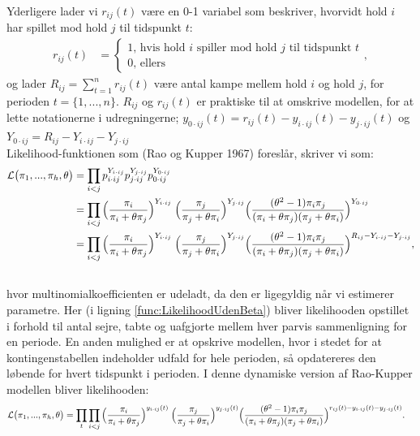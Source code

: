 \documentclass[11pt,a4paper]{article}
\begin{document}
Yderligere lader vi $r_{ij}(t)$ være en 0-1 variabel som beskriver, hvorvidt hold $i$ har spillet mod hold $j$ til tidspunkt $t$:
\begin{align*}
r_{ij}(t)&=\begin{cases}
1\text{, hvis hold $i$ spiller mod hold $j$ til tidspunkt $t$}\\
0\text{, ellers}
\end{cases},
\end{align*}
og lader $R_{ij}=\sum_{t=1}^nr_{ij}(t)$ være antal kampe mellem hold $i$ og hold $j$, for perioden $t=\{1,...,n\}$. $R_{ij}$ og $r_{ij}(t)$ er praktiske til at omskrive modellen, for at lette notationerne i udregningerne; $y_{0\cdot ij}(t)=r_{ij}(t)-y_{i\cdot ij}(t)-y_{j\cdot ij}(t)$ og $Y_{0\cdot ij}=R_{ij}-Y_{i\cdot ij}-Y_{j\cdot ij}$\\
Likelihood-funktionen som (Rao og Kupper 1967) \cite{RaoKupper} foreslår, skriver vi som:
\begin{align}
\mathcal{L}\big{(}\pi_1,...,\pi_h,\theta\big{)} &= \prod_{i<j}p_{i\cdot ij}^{Y_{i\cdot ij}}p_{j\cdot ij}^{Y_{j\cdot ij}}p_{0\cdot ij}^{Y_{0\cdot ij}}  \nonumber\\
&= \prod_{i<j}\Big{(}\frac{\pi_i}{\pi_i+\theta\pi_j}\Big{)}^{Y_{i\cdot ij}} \label{func:LikelihoodUdenBeta}
\;\Big{(}\frac{\pi_j}{\pi_j+\theta\pi_i}\Big{)}^{Y_{j\cdot ij}}
\Big{(}\frac{(\theta^2-1)\pi_i \pi_j}{(\pi_i+\theta\pi_j)(\pi_j+\theta\pi_i)}\Big{)}^{Y_{0\cdot ij}}\\
&=\prod_{i<j}\Big{(}\frac{\pi_i}{\pi_i+\theta\pi_j}\Big{)}^{Y_{i\cdot ij}}
\;\Big{(}\frac{\pi_j}{\pi_j+\theta\pi_i}\Big{)}^{Y_{j\cdot ij}}
\Big{(}\frac{(\theta^2-1)\pi_i  \pi_j}{(\pi_i+\theta\pi_j)(\pi_j+\theta\pi_i)}\Big{)}^{R_{ij}-{Y_{i\cdot ij}}-{Y_{j\cdot ij}}},\nonumber\\ \nonumber
\end{align}
hvor multinomialkoefficienten er udeladt, da den er ligegyldig når vi estimerer parametre. Her (i ligning \ref{func:LikelihoodUdenBeta}) bliver likelihooden opstillet i forhold til antal sejre, tabte og uafgjorte mellem hver parvis sammenligning for en periode. En anden mulighed er at opskrive modellen, hvor i stedet for at kontingenstabellen indeholder udfald for hele perioden, så opdatereres den løbende for hvert tidspunkt i perioden. I denne dynamiske version af Rao-Kupper modellen bliver likelihooden:
\begin{align*}
\mathcal{L}\big{(}\pi_1,...,\pi_h,\theta\big{)}
&=\prod_t\prod_{i<j}\Big{(}\frac{\pi_i}{\pi_i+\theta\pi_j}\Big{)}^{y_{i\cdot ij}(t)}
\;\Big{(}\frac{\pi_j}{\pi_j+\theta\pi_i}\Big{)}^{y_{j\cdot ij}(t)}
\Big{(}\frac{(\theta^2-1)\pi_i \pi_j}{(\pi_i+\theta\pi_j)(\pi_j+\theta\pi_i)}\Big{)}^{r_{ij}(t)-{y_{i\cdot ij}(t)}-{y_{j\cdot ij}(t)}}.
\end{align*}
\end{document}
